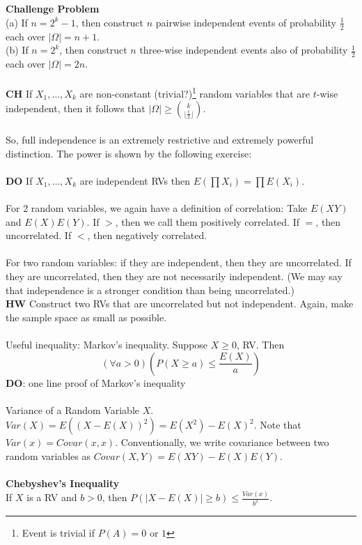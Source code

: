 \documentclass[12pt]{article}
\theoremstyle{remark}
\begin{document}
\begin{section}
\\\\\textbf{Challenge Problem}
\\(a) If $n=2^k-1$, then construct $n$ pairwise independent events of probability $\frac12$ each over $|\Omega| = n+1$.
\\(b) If $n=2^k$, then construct $n$ three-wise independent events also of probability $\frac12$ each over $|\Omega| = 2n$.
\\\\\textbf{CH} If $X_1,\ldots,X_k$ are non-constant (trivial?)\footnote{Event is trivial if $P(A) = 0$ or $1$} random variables that are $t$-wise independent, then it follows that $|\Omega| \geq {k \choose \lfloor\frac{t}{2} \rfloor}$.
\\\\So, full independence is an extremely restrictive and extremely powerful distinction. The power is shown by the following exercise:
\\\\\textbf{DO} If $X_1,\ldots,X_k$ are independent RVs then $E(\prod X_i) = \prod E(X_i)$.
\\\\For 2 random variables, we again have a definition of correlation: Take $E(XY)$ and $E(X)E(Y)$. If $>$, then we call them positively correlated. If $=$, then uncorrelated. If $<$, then negatively correlated.
\\\\For two random variables: if they are independent, then they are uncorrelated. If they are uncorrelated, then they are not necessarily independent. (We may say that independence is a stronger condition than being uncorrelated.) 
\\\textbf{HW} Construct two RVs that are uncorrelated but not independent. Again, make the sample space as small as possible.
\\\\Useful inequality: Markov's inequality. Suppose $X \geq 0$, RV. Then $$(\forall a > 0)(P(X \geq a) \leq \frac{E(X)}{a})$$ \textbf{DO}: one line proof of Markov's inequality
\\\\
Variance of a Random Variable $X$. $Var(X) = E((X-E(X))^2) = E(X^2)-E(X)^2$. Note that $Var(x) = Covar(x,x)$. Conventionally, we write covariance between two random variables as $Covar(X,Y) = E(XY) -E(X)E(Y)$.
\\\\
\textbf{Chebyshev's Inequality}
\\If $X$ is a RV and $b>0$, then $P(|X-E(X)| \geq b) \leq \frac{Var(x)}{b^2}$. 

\end{section}
\end{document}
